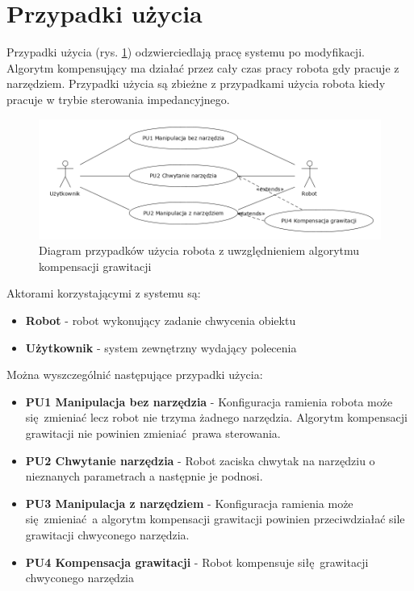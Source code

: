 \section{Przypadki użycia}
Przypadki użycia (rys. \ref{fig:usecase}) odzwierciedlają pracę systemu po modyfikacji. Algorytm kompensujący ma działać przez cały czas pracy robota gdy pracuje z narzędziem. Przypadki użycia są zbieżne z przypadkami użycia robota kiedy pracuje w trybie sterowania impedancyjnego.

\begin{figure}[H]
	\centering
	\includegraphics[width=.9\textwidth]{images/usecase.png}
	\caption{Diagram przypadków użycia robota z uwzględnieniem algorytmu kompensacji grawitacji}
	\label{fig:usecase}
\end{figure}


Aktorami korzystającymi z systemu są:
\begin{itemize}
	\item \textbf{Robot} - robot wykonujący zadanie chwycenia obiektu
	\item \textbf{Użytkownik} - system zewnętrzny wydający polecenia
\end{itemize}


Można wyszczególnić następujące przypadki użycia:
\begin{itemize}
	\item \textbf{PU1 Manipulacja bez narzędzia} - Konfiguracja ramienia robota może się zmieniać lecz robot nie trzyma żadnego narzędzia. Algorytm kompensacji grawitacji nie powinien zmieniać prawa sterowania. 
	\item \textbf{PU2 Chwytanie narzędzia} - Robot zaciska chwytak na narzędziu o nieznanych parametrach a następnie je podnosi.  
	\item \textbf{PU3 Manipulacja z narzędziem} - Konfiguracja ramienia może się zmieniać a algorytm kompensacji grawitacji powinien przeciwdziałać sile grawitacji chwyconego narzędzia.
	\item \textbf{PU4 Kompensacja grawitacji} - Robot kompensuje siłę grawitacji chwyconego narzędzia
\end{itemize}



